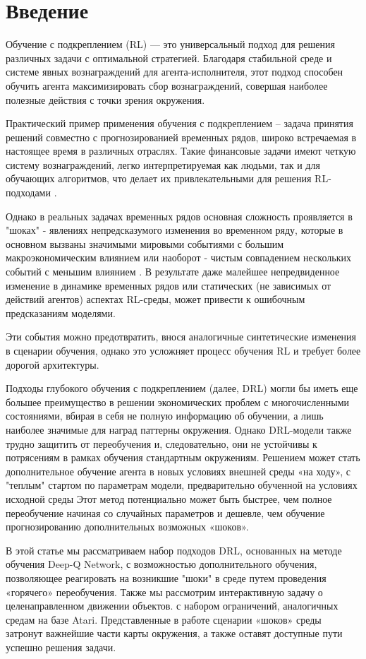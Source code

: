 \section{Введение}

\setcounter{page}{1}

Обучение с подкреплением (RL) — это универсальный подход для решения
различных задачи с оптимальной стратегией.
Благодаря стабильной среде и системе явных вознаграждений для агента-исполнителя, этот
подход способен обучить агента максимизировать сбор вознаграждений,
совершая наиболее полезные действия с точки зрения окружения.

Практический пример применения обучения с подкреплением – задача 
принятия решений совместно с прогнозированией временных рядов, широко встречаемая в настоящее время 
в различных отраслях.
Такие финансовые задачи имеют четкую систему вознаграждений, легко интерпретируемая как людьми, так и для обучающих
алгоритмов, что делает их привлекательными для решения RL-подходами \cite{choi2009reinforcement, madureira2023ensemble}.

Однако в реальных задачах временных рядов основная сложность проявляется в "шоках" - явлениях
непредсказумого изменения во временном ряду,
которые в основном вызваны значимыми мировыми событиями с большим макроэкономическим влиянием или наоборот - чистым 
совпадением нескольких событий с меньшим влиянием \cite{balke1994large}.
В результате даже малейшее непредвиденное изменение в динамике временных рядов или статических 
(не зависимых от действий агентов) аспектах RL-среды,
может привести к ошибочным предсказаниям моделями.

Эти события можно предотвратить, внося аналогичные синтетические изменения в сценарии обучения, 
однако это усложняет процесс обучения RL и требует более дорогой архитектуры.

Подходы глубокого обучения с подкреплением (далее, DRL) могли бы иметь еще большее преимущество в решении 
экономических проблем с многочисленными состояниями, вбирая в себя не полную информацию об обучении, а 
лишь наиболее значимые для наград паттерны окружения. 
Однако DRL-модели также трудно защитить от переобучения и, следовательно, они не устойчивы к потрясениям в 
рамках обучения стандартным окружениям.
Решением может стать дополнительное обучение агента в новых условиях внешней среды «на ходу»,
с "теплым" стартом по параметрам модели, предварительно обученной на условиях исходной среды
Этот метод потенциально может быть быстрее, чем полное переобучение начиная со
случайных параметров и дешевле, чем обучение прогнозированию
дополнительных возможных «шоков».

В этой статье мы рассматриваем набор подходов DRL, основанных на методе обучения Deep-Q Network,
с возможностью дополнительного обучения, позволяющее реагировать на возникшие "шоки" в среде
путем проведения «горячего» переобучения.
Также мы рассмотрим интерактивную задачу о целенаправленном движении объектов.
с набором ограничений, аналогичных средам на базе Atari.
Представленные в работе сценарии «шоков» среды затронут важнейшие части карты окружения, 
а также оставят доступные пути успешно решения задачи.
